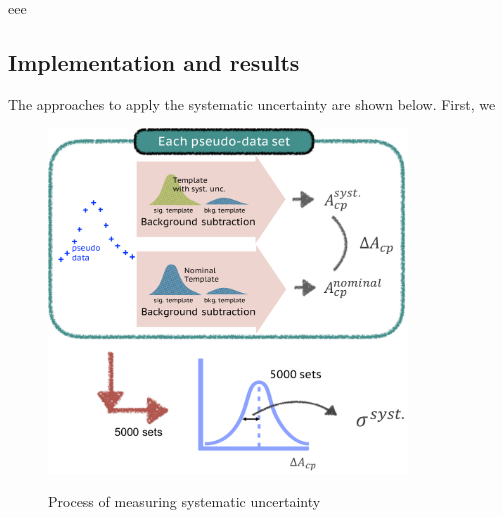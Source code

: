 			eee
	\subsection{Implementation and results}
	\label{ssec:Syst_imp_result}

		The approaches to apply the systematic uncertainty are shown below. First, we 

		\begin{figure}[H]
		\centering{}
	    	\includegraphics[width=0.85\textwidth]{Figures/SystUnc/approach_syst.pdf}\\
		\caption{Process of measuring systematic uncertainty}
		\label{BkgEst:fig:Bkt_sub}
		\end{figure}
		\FloatBarrier


\FloatBarrier
